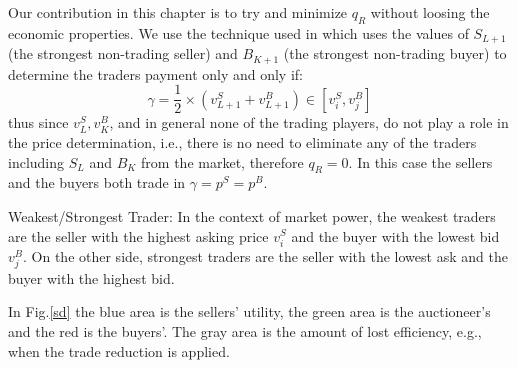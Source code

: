 \begin{enumerate}

Our contribution in this chapter is to try and minimize $q^{}_R$ without loosing the economic properties. We use the technique used in \cite{MCAFEE1992434} which uses the values of $S_{L+1}$ (the strongest non-trading seller) and $B_{K+1}$ (the strongest non-trading buyer) to determine the traders payment only and only if:
\begin{equation}
\gamma = {\frac{1}{2}}\times({v_{{L+1}}^{S}+v_{{L+1}}^B}) \in [v_{i}^{S},v_{j}^{{B}}]
\end{equation}
thus since $v_L^S, v_K^B$, and in general none of the trading players, do not play a role in the price determination, i.e., there is no need to eliminate any of the traders including $S_{L}$ and $B_{K}$ from the market, therefore $q^{}_R = 0$. In this case the sellers and the buyers both trade in $\gamma=p^S=p^B$.


\begin{Definition}
Weakest/Strongest Trader:
In the context of market power, the weakest traders are the seller with the highest asking price $v_{i}^S$ and the buyer with the lowest bid $v_{j}^{B}$. On the other side, strongest traders are the seller with the lowest ask and the buyer with the highest bid.
\end{Definition}

In Fig.\ref{sd} the blue area is the sellers' utility, the green area is the auctioneer's and the red is the buyers'. The gray area is the amount of lost efficiency, e.g., when the trade reduction is applied.
\end{enumerate}



